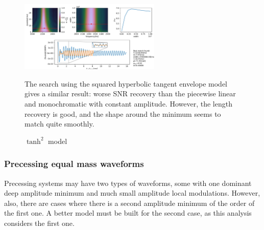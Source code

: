 \begin{figure}[hbt!]
\begin{center}
\includegraphics[width=0.6\textwidth, angle=0]{images/Data_analysis/results/envel_35_tanh2.pdf}
\caption{$\tanh^2$ model}
\end{center}
The search using the squared hyperbolic tangent envelope model gives a similar result: worse SNR recovery than the piecewise linear and monochromatic with constant amplitude. However, the length recovery is good, and the shape around the minimum seems to match quite smoothly.
\end{figure}

\FloatBarrier


\subsubsection*{Precessing equal mass waveforms}

Precessing systems may have two types of waveforms, some with one dominant deep amplitude minimum and much small amplitude local modulations. However, also, there are cases where there is a second amplitude minimum of the order of the first one. A better model must be built for the second case, as this analysis considers the first one.

